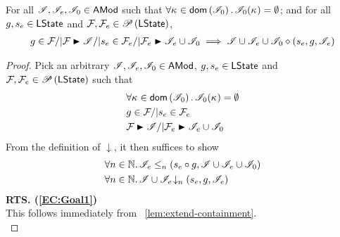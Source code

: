 \begin{lemma}\label{lem:extend-closure}
%
For all $\mathscr{I}, \mathscr{I}_{e}, \mathscr{I}_{0} \in \textsf{AMod}$ such that $\forall \kappa_{} \in \textsf{dom}\left( \mathscr{I}_0 \right).\, \mathscr{I}_0(\kappa_{}) = \emptyset$; and for all $g, s_e \in \textsf{LState}$ and $\mathcal{F}_{}, \mathcal{F}_{e} \in \mathscr{P}\left(\textsf{LState} \right)$,
\[
\begin{array}{l l}
	g \in \fence{} /| \fence{} \strictfences \lmod /| s_e \in \fence{e} /| \fence{e} \strictfences \lmod_e \cup \lmod_0
	\implies  \extendsAM{\lmod \cup \lmod_{e} \cup \lmod_0}{s_{e}}{g}{\lmod_{e}}
\end{array}
\]
%
\begin{proof} Pick an arbitrary $\mathscr{I}, \mathscr{I}_e, \mathscr{I}_0 \in \textsf{AMod}$, $g, s_e \in \textsf{LState}$ and $\mathcal{F}_{}, \mathcal{F}_{e} \in \mathscr{P}\left(\textsf{LState} \right)$ such that 
%
\begin{align}
	& \for{\ca{} \in \dom{\lmod_0}} \lmod_0(\ca{}) = \emptyset \label{EC:Ass0}\\
	& g \in \fence{} /|  s_e \in \fence{e}   \label{EC:Ass1}\\
	& \fence{} \strictfences \lmod /| \fence{e} \strictfences \lmod_e \cup \lmod_0 \label{EC:Ass2}
\end{align} 
%
From the definition of $\downarrow$, it then suffices to show
%
\begin{align}
	& \forall n \in \mathbb{N}.\, \mathscr{I}_e \leq_{n}\left(s_e \circ g, \mathscr{I} \cup \mathscr{I}_e \cup \mathscr{I}_0\right) \label{EC:Goal1}\\
	& \forall n \in \mathbb{N}.\,  \mathscr{I} \cup \mathscr{I}_e \!\downarrow_{n} \left(s_e, g, \mathscr{I}_e\right) \label{EC:Goal2}
\end{align}
%
\noindent\textbf{RTS. (\ref{EC:Goal1})} \\
This follows immediately from \lem~\ref{lem:extend-containment}.\\


\end{proof}
\end{lemma}
